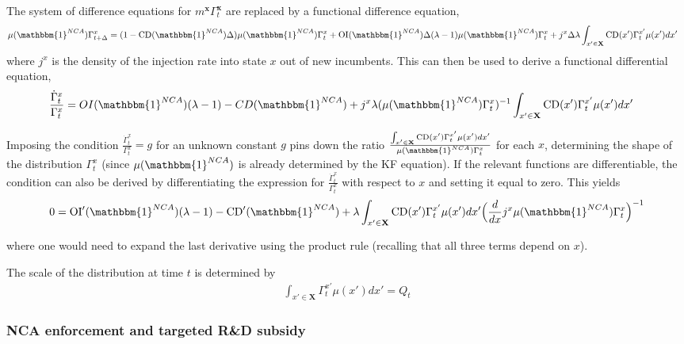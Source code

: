\documentclass[11pt,english]{article}
\theoremstyle{definition}
\begin{document}
The system of difference equations for $m^{\textbf{x}} \Gamma_t^{\textbf{x}}$ are replaced by a functional difference equation, 
\begin{align}
	\mu(\mathbbm{1}^{NCA}) \Gamma_{t+\Delta}^x &= (1- \text{CD}(\mathbbm{1}^{NCA}) \Delta) \mu(\mathbbm{1}^{NCA}) \Gamma_t^x + \text{OI}(\mathbbm{1}^{NCA}) \Delta (\lambda -1) \mu(\mathbbm{1}^{NCA}) \Gamma_t^x +  j^x \Delta  \lambda \int_{x' \in \mathbf{X}} \text{CD}(x') \Gamma_t^{x'} \mu(x') dx'
\end{align}
where $j^x$ is the density of the injection rate into state $x$ out of new incumbents. This can then be used to derive a functional differential equation,
\begin{align}
	\frac{\dot{\Gamma}_{t}^x}{\Gamma_t^x} &= OI(\mathbbm{1}^{NCA}) (\lambda -1) - CD(\mathbbm{1}^{NCA}) + j^x \lambda (\mu(\mathbbm{1}^{NCA}) \Gamma_t^x)^{-1} \int_{x' \in \mathbf{X}} \text{CD}(x') \Gamma_t^{x'} \mu(x') dx'
\end{align}

Imposing the condition $\frac{\dot{\Gamma}_{t}^x}{\Gamma_t^x} = g$ for an unknown constant $g$ pins down the ratio $\frac{\int_{x' \in \mathbf{X}} \text{CD}(x') \Gamma_t^{x'} \mu(x') dx'}{\mu(\mathbbm{1}^{NCA}) \Gamma_t^x}$ for each $x$, determining the shape of the distribution $\Gamma_t^x$ (since $\mu(\mathbbm{1}^{NCA})$ is already determined by the KF equation). If the relevant functions are differentiable, the condition can also be derived by differentiating the expression for $\frac{\dot{\Gamma}_t^x}{\Gamma_t^x}$ with respect to $x$ and setting it equal to zero. This yields
\begin{align}
	0 = \text{OI}'(\mathbbm{1}^{NCA}) (\lambda -1) - \text{CD}'(\mathbbm{1}^{NCA}) + \lambda \int_{x' \in \mathbf{X}} \text{CD}(x') \Gamma_t^{x'} \mu(x') dx' \Big(\frac{d}{dx} j^x \mu(\mathbbm{1}^{NCA}) \Gamma_t^x \Big)^{-1}
\end{align} 

where one would need to expand the last derivative using the product rule (recalling that all three terms depend on $x$). 

The scale of the distribution at time $t$ is determined by 
\begin{align}
	\int_{x' \in \mathbf{X}} \Gamma_t^{x'} \mu(x') dx' = Q_t
\end{align}




\subsubsection{NCA enforcement and targeted R\&D subsidy}\label{appendix:model:efficiencyderivations:allPolicies}
\end{document}
